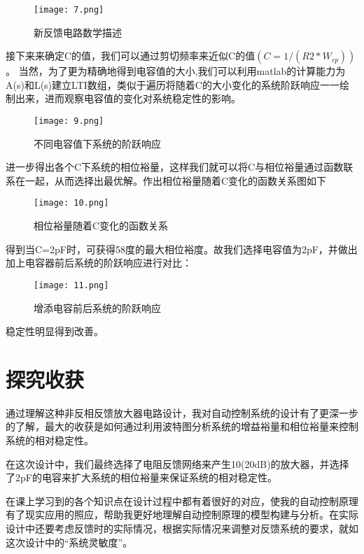 \documentclass[AutoFakeBold]{LZUThesis}
\begin{document}
\begin{figure}[htbp]
    \centering
    \texttt{[image: 7.png]}
    \caption{新反馈电路数学描述}
\end{figure}

接下来来确定C的值，我们可以通过剪切频率来近似C的值$(C = 1/(R2*W_{cp}))$。
当然，为了更为精确地得到电容值的大小,我们可以利用matlab的计算能力为A(s)和L(s)建立LTI数组，类似于遍历将随着C的大小变化的系统阶跃响应一一绘制出来，进而观察电容值的变化对系统稳定性的影响。

\begin{figure}[htbp]
    \centering
    \texttt{[image: 9.png]}
    \caption{不同电容值下系统的阶跃响应}
\end{figure}

进一步得出各个C下系统的相位裕量，这样我们就可以将C与相位裕量通过函数联系在一起，从而选择出最优解。作出相位裕量随着C变化的函数关系图如下


\begin{figure}[htbp]
    \centering
    \texttt{[image: 10.png]}
    \caption{相位裕量随着C变化的函数关系}
\end{figure}

得到当C=2pF时，可获得58度的最大相位裕度。故我们选择电容值为2pF，并做出加上电容器前后系统的阶跃响应进行对比：

\begin{figure}[htbp]
    \centering
    \texttt{[image: 11.png]}
    \caption{增添电容前后系统的阶跃响应}
\end{figure}

稳定性明显得到改善。

\chapter{探究收获}
通过理解这种非反相反馈放大器电路设计，我对自动控制系统的设计有了更深一步的了解，最大的收获是如何通过利用波特图分析系统的增益裕量和相位裕量来控制系统的相对稳定性。

在这次设计中，我们最终选择了电阻反馈网络来产生10(20dB)的放大器，并选择了2pF的电容来扩大系统的相位裕量来保证系统的相对稳定性。

在课上学习到的各个知识点在设计过程中都有着很好的对应，使我的自动控制原理有了现实应用的照应，帮助我更好地理解自动控制原理的模型构建与分析。在实际设计中还要考虑反馈时的实际情况，根据实际情况来调整对反馈系统的要求，就如这次设计中的“系统灵敏度”。






\backmatter


\printbib
\nocite{*} %




\end{document}
